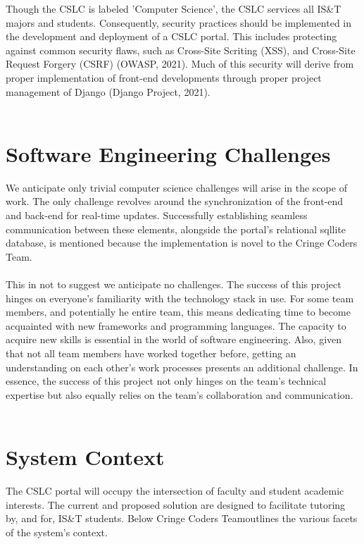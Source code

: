 \documentclass[oneside,openany,obeyspaces]{book}
\newcommand\tab[1][1cm]{\hspace*{#1}}
\newcommand\TeamName{Cringe Coders Team}
\begin{document}
\begin{flushleft}
    \tab Though the CSLC is labeled 'Computer Science', the CSLC services all IS\&T majors and students. Consequently, security practices should be implemented in the development and deployment of a CSLC portal. This includes protecting against common security flaws, such as Cross-Site Scriting (XSS),  and Cross-Site Request Forgery (CSRF) (OWASP, 2021). Much of this security will derive from proper implementation of front-end developments through proper project management of Django (Django Project, 2021).\\~\\


    \section{Software Engineering Challenges}

    \tab We anticipate only trivial computer science challenges will arise in the scope of work. The only challenge revolves around the synchronization of the front-end and back-end for real-time updates. Successfully establishing seamless communication between these elements, alongside the portal's relational sqllite database, is mentioned because the implementation is novel to the \TeamName.\\~\\

    \tab This in not to suggest we anticipate no challenges. The success of this project hinges on everyone's familiarity with the technology stack in use. For some team members, and potentially he entire team, this means dedicating time to become acquainted with new frameworks and programming languages. The capacity to acquire new skills is essential in the world of software engineering. Also, given that not all team members have worked together before, getting an understanding on each other's work processes presents an additional challenge. In essence, the success of this project not only hinges on the team's technical expertise but also equally relies on the team's collaboration and communication.\\~\\


    \section{System Context}

    \tab The CSLC portal will occupy the intersection of faculty and student academic interests. The current and proposed solution are designed to facilitate tutoring by, and for, IS\&T students. Below \TeamName\space outlines the various facets of the system's context.\\~\\


\end{flushleft}
\end{document}
